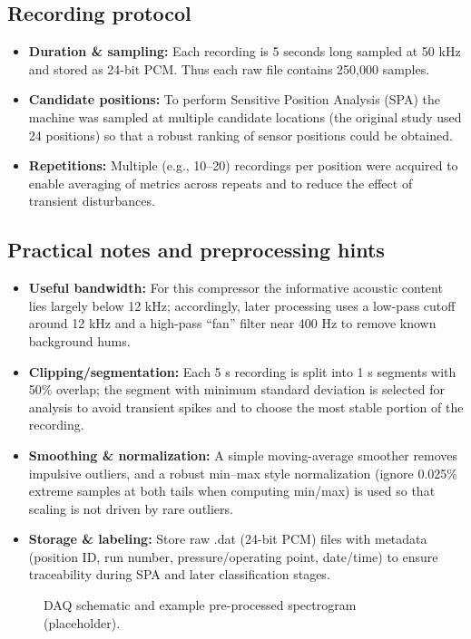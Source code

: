 \documentclass[12pt,a4paper]{article}
\begin{document}
\subsection{Recording protocol}
\begin{itemize}
  \item \textbf{Duration \& sampling:} Each recording is 5 seconds long sampled at 50 kHz and stored as 24-bit PCM. Thus each raw file contains 250,000 samples.
  \item \textbf{Candidate positions:} To perform Sensitive Position Analysis (SPA) the machine was sampled at multiple candidate locations (the original study used 24 positions) so that a robust ranking of sensor positions could be obtained.
  \item \textbf{Repetitions:} Multiple (e.g., 10--20) recordings per position were acquired to enable averaging of metrics across repeats and to reduce the effect of transient disturbances.
\end{itemize}

\subsection{Practical notes and preprocessing hints}
\begin{itemize}
  \item \textbf{Useful bandwidth:} For this compressor the informative acoustic content lies largely below 12 kHz; accordingly, later processing uses a low-pass cutoff around 12 kHz and a high-pass ``fan'' filter near 400 Hz to remove known background hums.
  \item \textbf{Clipping/segmentation:} Each 5 s recording is split into 1 s segments with 50\% overlap; the segment with minimum standard deviation is selected for analysis to avoid transient spikes and to choose the most stable portion of the recording.
  \item \textbf{Smoothing \& normalization:} A simple moving-average smoother removes impulsive outliers, and a robust min–max style normalization (ignore 0.025\% extreme samples at both tails when computing min/max) is used so that scaling is not driven by rare outliers.
  \item \textbf{Storage \& labeling:} Store raw .dat (24-bit PCM) files with metadata (position ID, run number, pressure/operating point, date/time) to ensure traceability during SPA and later classification stages.
\end{itemize}

\begin{figure}[ht]
  \centering
  \caption{DAQ schematic and example pre-processed spectrogram (placeholder).}
  \label{fig:daq_placeholder}
\end{figure}
\end{document}
